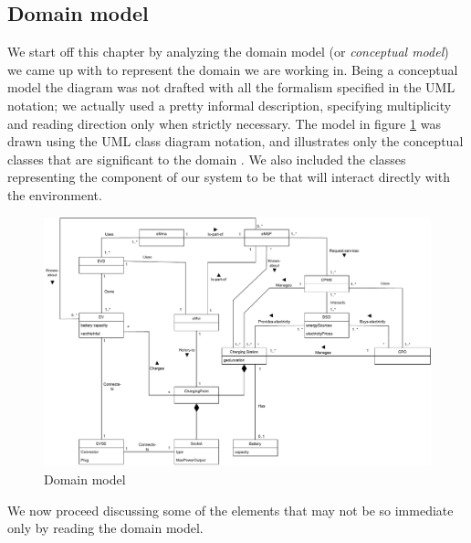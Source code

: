 
\subsection{Domain model}
We start off this chapter by analyzing the domain model (or \textit{conceptual model}) we came up with to represent the domain we are working in. Being a conceptual model the diagram was not drafted with all the formalism specified in the UML notation; we actually used a pretty informal description, specifying multiplicity and reading direction only when strictly necessary. The model in figure \ref{domain_model} was drawn using the UML class diagram notation, and illustrates only the conceptual classes that are significant to the domain \cite{larmanUML}. We also included the classes representing the component of our system to be that will interact directly with the environment.\\

\begin{figure}[H]
    \centering
    \includegraphics[width=1\textwidth]{Images/cp2/domain_model_v1}
    \caption{Domain model}
    \label{domain_model}
\end{figure}

We now proceed discussing some of the elements that may not be so immediate only by reading the domain model.


